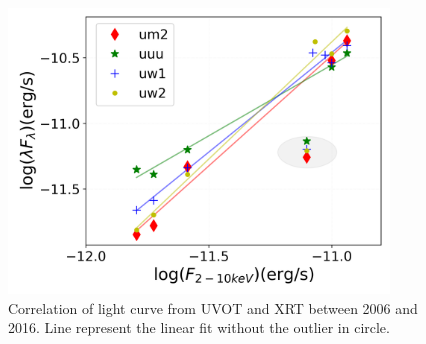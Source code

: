\documentclass{aastex63}
\begin{document}
\begin{figure}
\centering
	\includegraphics[width=0.9\textwidth]{./pic/uvot_xrt_correlation-fig-without-outlier.png}
    \caption{Correlation of light curve from UVOT and XRT  between 2006 and 2016. Line represent the linear fit without the outlier in circle.}
    \label{fig:correlation-uvot-xray}
\end{figure}








\end{document}
